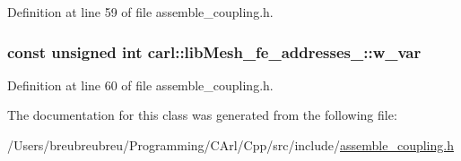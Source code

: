 Definition at line 59 of file assemble\+\_\+coupling.\+h.

\hypertarget{classcarl_1_1lib_mesh__fe__addresses__3_ac20af6d63174a015605348bd0cf83f1c}{}
\subsubsection[{w\+\_\+var}]{\setlength{\rightskip}{0pt plus 5cm}const unsigned int carl\+::lib\+Mesh\+\_\+fe\+\_\+addresses\+\_\+::w\+\_\+var}\label{classcarl_1_1lib_mesh__fe__addresses__3_ac20af6d63174a015605348bd0cf83f1c}


Definition at line 60 of file assemble\+\_\+coupling.\+h.



The documentation for this class was generated from the following file\+:\begin{DoxyCompactItemize}
\item 
/\+Users/breubreubreu/\+Programming/\+C\+Arl/\+Cpp/src/include/\hyperlink{assemble__coupling_8h}{assemble\+\_\+coupling.\+h}\end{DoxyCompactItemize}
